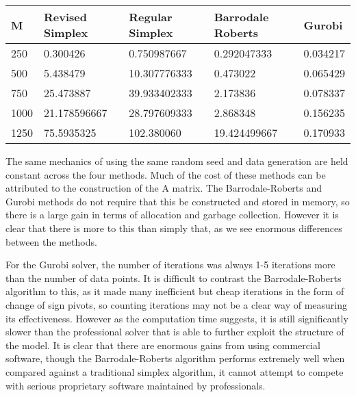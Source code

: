 \documentclass[12pt]{paper}
\begin{document}
\begin{centering}
\begin{tabular}{|l|l|l|l|l|}
  \hline
  M & Revised Simplex & Regular Simplex & Barrodale Roberts & Gurobi\\\hline
250 &
0.300426 &
0.750987667 &
0.292047333 &
0.034217
\\
500 &
5.438479 &
10.307776333 &
0.473022 &
0.065429
\\
750 &
25.473887 &
39.933402333 &
2.173836 &
0.078337
\\
1000 &
21.178596667 &
28.797609333 &
2.868348 &
0.156235
\\
1250 &
75.5935325 &
102.380060 &
19.424499667 &
0.170933
\\\hline
\end{tabular}
  
\end{centering}
The same mechanics of using the same random seed and data generation
are held constant across the four methods. Much of the cost of these
methods can be attributed to the construction of the A matrix. The
Barrodale-Roberts and Gurobi methods do not require that this be
constructed and stored in memory, so there is a large gain in terms of
allocation and garbage collection. However it is clear that there is
more to this than simply that, as we see enormous differences between
the methods.

For the Gurobi solver, the number of iterations was always 1-5
iterations more than the number of data points. It is difficult to
contrast the Barrodale-Roberts algorithm to this, as it made many
inefficient but cheap iterations in the form of change of sign pivots,
so counting iterations may not be a clear way of measuring its
effectiveness. However as the computation time suggests, it is still
significantly slower than the professional solver that is able to
further exploit the structure of the model. It is clear that there are
enormous gains from using commercial software, though the
Barrodale-Roberts algorithm performs extremely well when compared
against a traditional simplex algorithm, it cannot attempt to compete
with serious proprietary software maintained by professionals. 


  
\end{document}
